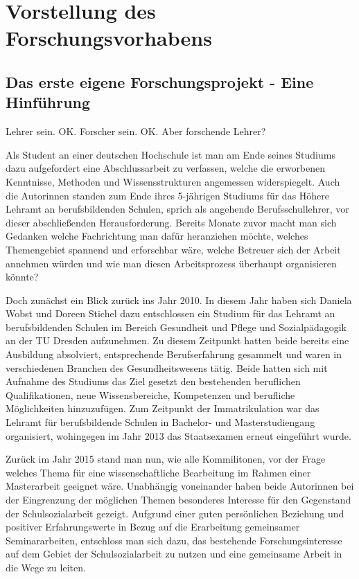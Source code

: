 \section{Vorstellung des Forschungsvorhabens}
\label{sec:VorstellungDesForschungsvorhabens}

\subsection{Das erste eigene Forschungsprojekt - Eine Hinführung}
\label{sec:DasErsteEigeneForschungsprojektEineHinführung}

Lehrer sein. OK. Forscher sein. OK. Aber forschende Lehrer?

Als Student an einer deutschen Hochschule ist man am Ende seines Studiums dazu aufgefordert eine Abschlussarbeit zu verfassen, welche die erworbenen Kenntnisse, Methoden und Wissensstrukturen angemessen widerspiegelt. Auch die Autorinnen standen zum Ende ihres 5-jährigen Studiums für das Höhere Lehramt an berufsbildenden Schulen, sprich als angehende Berufsschullehrer, vor dieser abschließenden Herausforderung. Bereits Monate zuvor macht man sich Gedanken welche Fachrichtung man dafür heranziehen möchte, welches Themengebiet spannend und erforschbar wäre, welche Betreuer sich der Arbeit annehmen würden und wie man diesen Arbeitsprozess überhaupt organisieren könnte? 

Doch zunächst ein Blick zurück ins Jahr 2010. In diesem Jahr haben sich Daniela Wobst und Doreen Stichel dazu entschlossen ein Studium für das Lehramt an berufsbildenden Schulen im Bereich Gesundheit und Pflege und Sozialpädagogik an der TU Dresden aufzunehmen. Zu diesem Zeitpunkt hatten beide bereits eine Ausbildung absolviert, entsprechende Berufserfahrung gesammelt und waren in verschiedenen Branchen des Gesundheitswesens tätig. Beide hatten sich mit Aufnahme des Studiums das Ziel gesetzt den bestehenden beruflichen Qualifikationen, neue Wissensbereiche, Kompetenzen und berufliche Möglichkeiten hinzuzufügen. Zum Zeitpunkt der Immatrikulation war das Lehramt für berufsbildende Schulen in Bachelor- und Masterstudiengang organisiert, wohingegen im Jahr 2013 das Staatsexamen erneut eingeführt wurde. 

Zurück im Jahr 2015 stand man nun, wie alle Kommilitonen, vor der Frage welches Thema für eine wissenschaftliche Bearbeitung im Rahmen einer Masterarbeit geeignet wäre. Unabhängig voneinander haben beide Autorinnen bei der Eingrenzung der möglichen Themen besonderes Interesse für den Gegenstand der Schulsozialarbeit gezeigt. Aufgrund einer guten persönlichen Beziehung und positiver Erfahrungswerte in Bezug auf die Erarbeitung gemeinsamer Seminararbeiten, entschloss man sich dazu, das bestehende Forschungsinteresse auf dem Gebiet der Schulsozialarbeit zu nutzen und eine gemeinsame Arbeit in die Wege zu leiten. 

